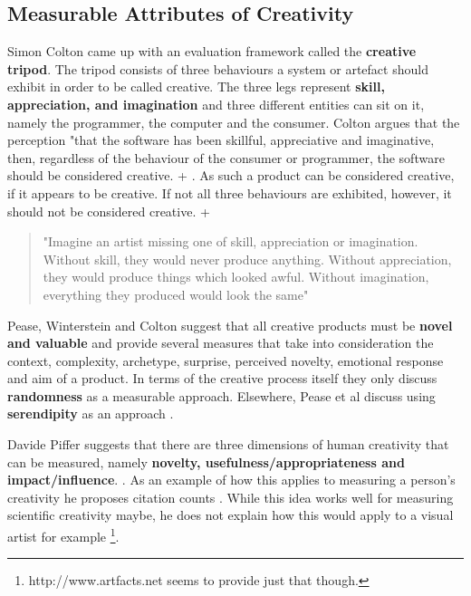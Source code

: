 \subsection{Measurable Attributes of Creativity}

Simon Colton came up with an evaluation framework called the \textbf{creative tripod}. The tripod consists of three behaviours a system or artefact should exhibit in order to be called creative. The three legs represent \textbf{skill, appreciation, and imagination} and three different entities can sit on it, namely the programmer, the computer and the consumer. Colton argues that the perception "that the software has been skillful, appreciative and imaginative, then, regardless of the behaviour of the consumer or programmer, the software should be considered creative. \citep[p.5]{Colton2008a} + \citep[p.5]{Colton2008b}. As such a product can be considered creative, if it appears to be creative. If not all three behaviours are exhibited, however, it should not be considered creative. \citep[p.5]{Colton2008a} + \citep[p.5]{Colton2008b}

\begin{quote}
  "Imagine an artist missing one of skill, appreciation or imagination. Without skill, they would never produce anything. Without appreciation, they would produce things which looked awful. Without imagination, everything they produced would look the same" \citep{Colton2008a}
\end{quote}

Pease, Winterstein and Colton suggest that all creative products must be \textbf{novel and valuable} \citep[p.1]{Pease2001} and provide several measures that take into consideration the context, complexity, archetype, surprise, perceived novelty, emotional response and aim of a product. In terms of the creative process itself they only discuss \textbf{randomness} as a measurable approach. Elsewhere, Pease et al discuss using \textbf{serendipity} as an approach \citep{Pease2013}.

Davide Piffer suggests that there are three dimensions of human creativity that can be measured, namely \textbf{novelty, usefulness/appropriateness and impact/influence}. \citep[p.258-259]{Piffer2012}. As an example of how this applies to measuring a person’s creativity he proposes citation counts \citep[p.261]{Piffer2012}. While this idea works well for measuring scientific creativity maybe, he does not explain how this would apply to a visual artist for example \footnote{http://www.artfacts.net seems to provide just that though.}.

